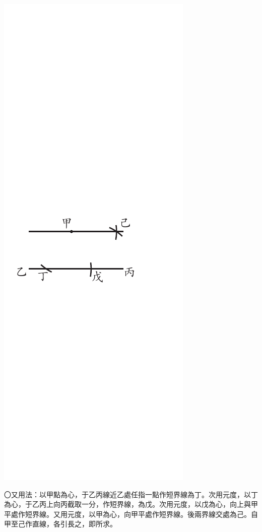 \documentclass[12pt,b5paper,landscape]{article}
\newcommand{\bcom}[1]{〇#1}
\begin{document}
\begin{multicols}{2}
\begin{center}
      \includegraphics[angle=90]{eu80}
\end{center}
\bcom{又用法：以甲點為心，于乙丙線近乙處任指一點作短界線為丁。次用元度，以丁為心，于乙丙上向丙截取一分，作短界線，為戊。次用元度，以戊為心，向上與甲平處作短界線。又用元度，以甲為心，向甲平處作短界線。後兩界線交處為己。自甲至己作直線，各引長之，即所求。}


\end{multicols}
\end{document}
